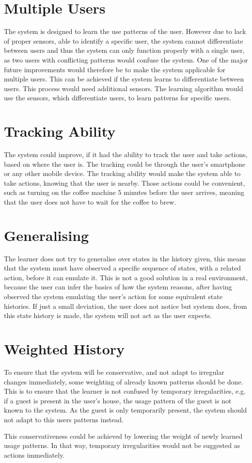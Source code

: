\section{Multiple Users}
The system is designed to learn the use patterns of the user. However due to lack of proper sensors, able to identify a specific user, the system cannot differentiate between users and thus the system can only function properly with a single user, as two users with conflicting patterns would confuse the system. One of the major future improvements would therefore be to make the system applicable for multiple users. This can be achieved if the system learns to differentiate between users. This process would need additional sensors. The learning algorithm would use the sensors, which differentiate users, to learn patterns for specific users.

\section{Tracking Ability}
The system could improve, if it had the ability to track the user and take actions, based on where the user is. The tracking could be through the user's smartphone or any other mobile device. The tracking ability would make the system able to take actions, knowing that the user is nearby. Those actions could be  convenient, such as turning on the coffee machine 5 minutes before the user arrives, meaning that the user does not have to wait for the coffee to brew.

\section{Generalising}\label{sec:dis:generalise}
The learner does not try to generalise over states in the history given, this means that the system must have observed a specific sequence of states, with a related action, before it can emulate it. This is not a good solution in a real environment, because the user can infer the basics of how the system reasons, after having observed the system emulating the user's action for some equivalent state histories. If just a small deviation, the user does not notice but system does, from this state history is made, the system will not act as the user expects.

\section{Weighted History}
To ensure that the system will be conservative, and not adapt to irregular changes immediately, some weighting of already known patterns should be done. This is to ensure that the learner is not confused by temporary irregularities, e.g. if a guest is present in the user's house, the usage pattern of the guest is not known to the system. As the guest is only temporarily present, the system should not adapt to this users patterns instead.

This conservativeness could be achieved by lowering the weight of newly learned usage patterns. In that way, temporary irregularities would not be suggested as actions immediately.
